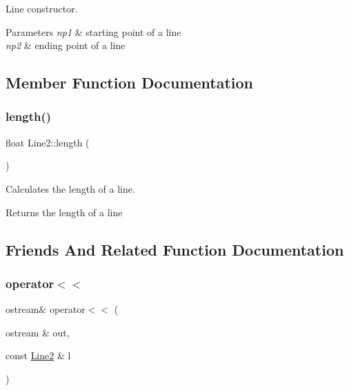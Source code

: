 Line constructor. 


\begin{DoxyParams}{Parameters}
{\em np1} & starting point of a line \\
\hline
{\em np2} & ending point of a line \\
\hline
\end{DoxyParams}


\subsection{Member Function Documentation}
\mbox{\label{class_line2_aa9216f71f2684ccff858dadf26bdad8f}} 
\subsubsection{\texorpdfstring{length()}{length()}}
{\footnotesize\ttfamily float Line2\+::length (\begin{DoxyParamCaption}{ }\end{DoxyParamCaption})}



Calculates the length of a line. 

\begin{DoxyReturn}{Returns}
the length of a line 
\end{DoxyReturn}


\subsection{Friends And Related Function Documentation}
\mbox{\label{class_line2_a2e9995cceed69d45eebc94c64526dd0b}} 
\subsubsection{\texorpdfstring{operator$<$$<$}{operator<<}}
{\footnotesize\ttfamily ostream\& operator$<$$<$ (\begin{DoxyParamCaption}\item[{ostream \&}]{out,  }\item[{const \mbox{\hyperlink{class_line2}{Line2}} \&}]{l }\end{DoxyParamCaption})\hspace{0.3cm}{\ttfamily [friend]}}



